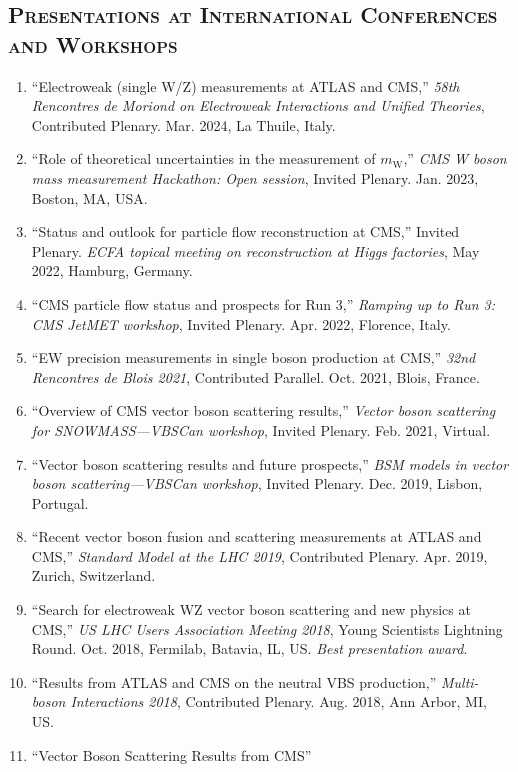 \documentclass[10pt]{res} %
\begin{document}
\begin{resume}
\section{\textsc{Presentations at International Conferences and Workshops}}
\begin{enumerate}
  \item ``Electroweak (single W/Z) measurements at ATLAS and CMS,''
    \emph{58th Rencontres de Moriond on Electroweak Interactions and Unified Theories}, Contributed Plenary. Mar. 2024, La Thuile, Italy.
  \item ``Role of theoretical uncertainties in the measurement of $m_{\mathrm{W}}$,''
    \emph{CMS W boson mass measurement Hackathon: Open session}, Invited Plenary. Jan. 2023, Boston, MA, USA.
  \item ``Status and outlook for particle flow reconstruction at CMS,'' Invited Plenary.
    \emph{ECFA topical meeting on reconstruction at Higgs factories}, May 2022, Hamburg, Germany.
  \item ``CMS particle flow status and prospects for Run 3,'' 
    \emph{Ramping up to Run 3: CMS JetMET workshop}, Invited Plenary. Apr. 2022, Florence, Italy.
  \item ``EW precision measurements in single boson production at CMS,'' 
    \emph{32nd Rencontres de Blois 2021}, Contributed Parallel. Oct. 2021, Blois, France.
  \item ``Overview of CMS vector boson scattering results,'' 
    \emph{Vector boson scattering for SNOWMASS---VBSCan workshop}, Invited Plenary. Feb. 2021, Virtual.
  \item ``Vector boson scattering results and future prospects,'' 
    \emph{BSM models in vector boson scattering---VBSCan workshop}, Invited Plenary. Dec. 2019, Lisbon, Portugal.
  \item ``Recent vector boson fusion and scattering measurements at ATLAS and CMS,'' 
    \emph{Standard Model at the LHC 2019}, Contributed Plenary. Apr. 2019, Zurich, Switzerland.
  \item ``Search for electroweak WZ vector boson scattering and new physics at CMS,''
    \emph{US LHC Users Association Meeting 2018}, Young Scientists Lightning Round. Oct. 2018, Fermilab, Batavia, IL, US. \emph{Best presentation award}.
  \item ``Results from ATLAS and CMS on the neutral VBS production,'' 
    \emph{Multi-boson Interactions 2018}, Contributed Plenary. Aug. 2018, Ann Arbor, MI, US.
  \item ``Vector Boson Scattering Results from CMS'' \\

\end{enumerate}
\end{resume}
\end{document}
